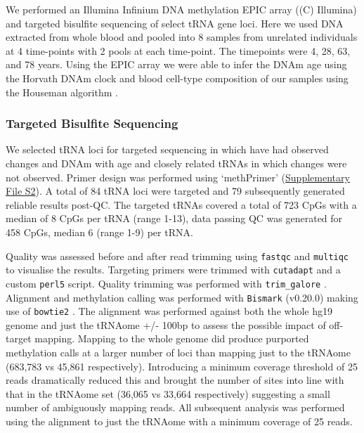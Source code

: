 \documentclass[]{book}
\begin{document}
We performed an Illumina Infinium DNA methylation EPIC array ((C) Illumina) and targeted bisulfite sequencing of select tRNA gene loci.
Here we used DNA extracted from whole blood and pooled into 8 samples from unrelated individuals at 4 time-points with 2 pools at each time-point.
The timepoints were 4, 28, 63, and 78 years.
Using the EPIC array we were able to infer the DNAm age using the Horvath DNAm clock \citep{Horvath2013} and blood cell-type composition of our samples using the Houseman algorithm \citep{Houseman2012}.

\hypertarget{targetedBiSseq}{%
\subsubsection{Targeted Bisulfite Sequencing}\label{targetedBiSseq}}

We selected tRNA loci for targeted sequencing in which have had observed changes and DNAm with age and closely related tRNAs in which changes were not observed.
Primer design was performed using `methPrimer' \citep{Li2002} (\href{./Supplementary_Files/Targeted_BiS-seq_Primers.txt}{Supplementary File S2}).
A total of 84 tRNA loci were targeted and 79 subsequently generated reliable results post-QC.
The targeted tRNAs covered a total of 723 CpGs with a median of 8 CpGs per tRNA (range 1-13), data passing QC was generated for 458 CpGs, median 6 (range 1-9) per tRNA.

Quality was assessed before and after read trimming using \texttt{fastqc} \citep{Andrews2010} and \texttt{multiqc} \citep{Ewels2016} to visualise the results.
Targeting primers were trimmed with \texttt{cutadapt} \citep{Martin2011} and a custom \texttt{perl5} script.
Quality trimming was performed with \texttt{trim\_galore} \citep{Krueger2015}.
Alignment and methylation calling was performed with \texttt{Bismark} (v0.20.0) \citep{Krueger2011} making use of \texttt{bowtie2} \citep{Langmead2012}.
The alignment was performed against both the whole hg19 genome and just the tRNAome +/- 100bp to assess the possible impact of off-target mapping. Mapping to the whole genome did produce purported methylation calls at a larger number of loci than mapping just to the tRNAome (683,783 vs 45,861 respectively).
Introducing a minimum coverage threshold of 25 reads dramatically reduced this and brought the number of sites into line with that in the tRNAome set (36,065 vs 33,664 respectively) suggesting a small number of ambiguously mapping reads. All subsequent analysis was performed using the alignment to just the tRNAome with a minimum coverage of 25 reads.
\end{document}
